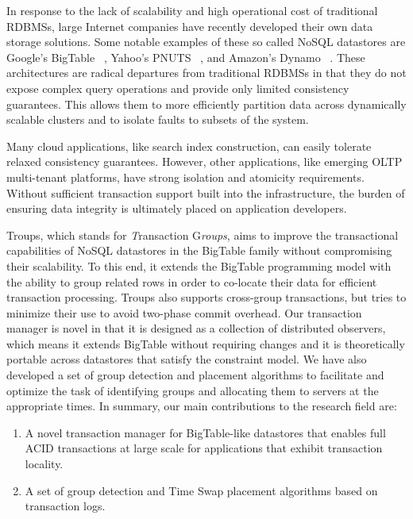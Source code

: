 \documentclass[10pt,final,journal]{IEEEtran}
\begin{document}
In response to the lack of scalability and high operational cost of traditional RDBMSs, large Internet companies have recently developed their own data storage solutions. Some notable examples of these so called NoSQL datastores are Google's BigTable ~\cite{Chang:2006:BDS:1267308.1267323}, Yahoo's PNUTS ~\cite{Cooper:2008:PYH:1454159.1454167}, and Amazon's Dynamo ~\cite{DeCandia:2007:DAH:1323293.1294281}. These architectures are radical departures from traditional RDBMSs in that they do not expose complex query operations and provide only limited consistency guarantees. This allows them to more efficiently partition data across dynamically scalable clusters and to isolate faults to subsets of the system.

Many cloud applications, like search index construction, can easily tolerate relaxed consistency guarantees. However, other applications, like emerging OLTP multi-tenant platforms, have strong isolation and atomicity requirements. Without sufficient transaction support built into the infrastructure, the burden of ensuring data integrity is ultimately placed on application developers.

Troups, which stands for \emph{T}ransaction G\emph{roups}, aims to improve the transactional capabilities of NoSQL datastores in the BigTable family without compromising their scalability. To this end, it extends the BigTable programming model with the ability to group related rows in order to co-locate their data for efficient transaction processing. Troups also supports cross-group transactions, but tries to minimize their use to avoid two-phase commit overhead. Our transaction manager is novel in that it is designed as a collection of distributed observers, which means it extends BigTable without requiring changes and it is theoretically portable across datastores that satisfy the constraint model. We have also developed a set of group detection and placement algorithms to facilitate and optimize the task of identifying groups and allocating them to servers at the appropriate times. In summary, our main contributions to the research field are:

\begin{enumerate}
\item A novel transaction manager for BigTable-like datastores that enables full ACID transactions at large scale for applications that exhibit transaction locality.
\item A set of group detection and Time Swap placement algorithms based on transaction logs.
\end{enumerate}
\end{document}
